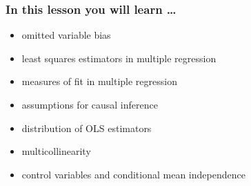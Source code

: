 

\begin{frame}
  \frametitle{In this lesson you will learn \dots}
  \begin{itemize}
  \item omitted variable bias
  \item least squares estimators in multiple regression
  \item measures of fit in multiple regression
  \item assumptions for causal inference
  \item distribution of OLS estimators
  \item multicollinearity
  \item control variables and conditional mean independence
  \end{itemize}
\end{frame}

